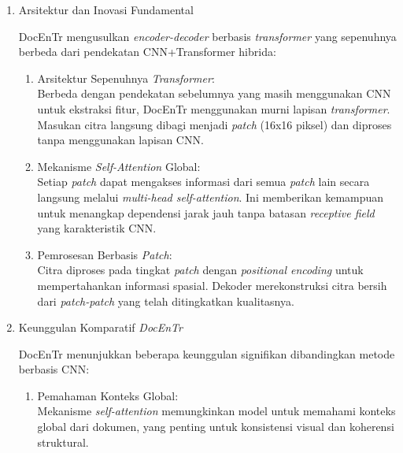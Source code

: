 \documentclass[12pt,a4paper]{article}
\begin{document}
\begin{enumerate}[leftmargin=*, labelindent=0pt, itemsep=1ex, topsep=0pt]

\item Arsitektur dan Inovasi Fundamental

DocEnTr mengusulkan \textit{encoder-decoder} berbasis \textit{transformer} yang sepenuhnya berbeda dari pendekatan CNN+Transformer hibrida:

\begin{enumerate}[leftmargin=1.5em, labelsep=0.5em, itemindent=0pt, label=\alph*., topsep=0pt, parsep=0pt, itemsep=0pt]
      \item Arsitektur Sepenuhnya \textit{Transformer}: \mbox{}\\[0.1em]
            Berbeda dengan pendekatan sebelumnya yang masih menggunakan CNN untuk ekstraksi fitur, DocEnTr menggunakan murni lapisan \textit{transformer}. Masukan citra langsung dibagi menjadi \textit{patch} (16x16 piksel) dan diproses tanpa menggunakan lapisan CNN.

      \item Mekanisme \textit{Self-Attention} Global: \mbox{}\\[0.1em]
            Setiap \textit{patch} dapat mengakses informasi dari semua \textit{patch} lain secara langsung melalui \textit{multi-head self-attention}. Ini memberikan kemampuan untuk menangkap dependensi jarak jauh tanpa batasan \textit{receptive field} yang karakteristik CNN.

      \item Pemrosesan Berbasis \textit{Patch}: \mbox{}\\[0.1em]
            Citra diproses pada tingkat \textit{patch} dengan \textit{positional encoding} untuk mempertahankan informasi spasial. Dekoder merekonstruksi citra bersih dari \textit{patch-patch} yang telah ditingkatkan kualitasnya.
\end{enumerate}

\item Keunggulan Komparatif \textit{DocEnTr}
\label{para:docentr-keunggulan}

DocEnTr menunjukkan beberapa keunggulan signifikan dibandingkan metode berbasis CNN:

\begin{enumerate}[leftmargin=1.5em, labelsep=0.5em, itemindent=0pt, label=\alph*., topsep=0pt, parsep=0pt, itemsep=0pt]
      \item Pemahaman Konteks Global: \mbox{}\\[0.1em]
            Mekanisme \textit{self-attention} memungkinkan model untuk memahami konteks global dari dokumen, yang penting untuk konsistensi visual dan koherensi struktural.


\end{enumerate}
\end{enumerate}
\end{document}
